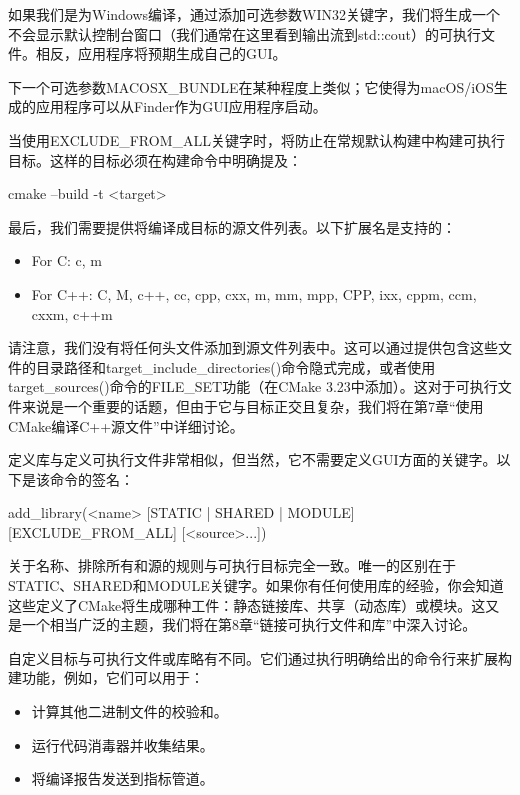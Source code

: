 如果我们是为Windows编译，通过添加可选参数WIN32关键字，我们将生成一个不会显示默认控制台窗口（我们通常在这里看到输出流到std::cout）的可执行文件。相反，应用程序将预期生成自己的GUI。

下一个可选参数MACOSX\_BUNDLE在某种程度上类似；它使得为macOS/iOS生成的应用程序可以从Finder作为GUI应用程序启动。

当使用EXCLUDE\_FROM\_ALL关键字时，将防止在常规默认构建中构建可执行目标。这样的目标必须在构建命令中明确提及：

\begin{shell}
cmake --build -t <target>
\end{shell}

最后，我们需要提供将编译成目标的源文件列表。以下扩展名是支持的：

\begin{itemize}
\item
For C: c, m

\item
For C++: C, M, c++, cc, cpp, cxx, m, mm, mpp, CPP, ixx, cppm, ccm, cxxm, c++m
\end{itemize}

请注意，我们没有将任何头文件添加到源文件列表中。这可以通过提供包含这些文件的目录路径和target\_include\_directories()命令隐式完成，或者使用target\_sources()命令的FILE\_SET功能（在CMake 3.23中添加）。这对于可执行文件来说是一个重要的话题，但由于它与目标正交且复杂，我们将在第7章“使用CMake编译C++源文件”中详细讨论。


定义库与定义可执行文件非常相似，但当然，它不需要定义GUI方面的关键字。以下是该命令的签名：

\begin{shell}
add_library(<name> [STATIC | SHARED | MODULE]
            [EXCLUDE_FROM_ALL]
            [<source>...])
\end{shell}

关于名称、排除所有和源的规则与可执行目标完全一致。唯一的区别在于STATIC、SHARED和MODULE关键字。如果你有任何使用库的经验，你会知道这些定义了CMake将生成哪种工件：静态链接库、共享（动态库）或模块。这又是一个相当广泛的主题，我们将在第8章“链接可执行文件和库”中深入讨论。


自定义目标与可执行文件或库略有不同。它们通过执行明确给出的命令行来扩展构建功能，例如，它们可以用于：

\begin{itemize}
\item
计算其他二进制文件的校验和。

\item
运行代码消毒器并收集结果。

\item
将编译报告发送到指标管道。
\end{itemize}

